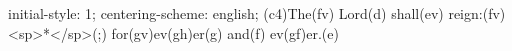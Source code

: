 initial-style: 1;
centering-scheme: english;
(c4)The(fv) Lord(d) shall(ev) reign:(fv) <sp>*</sp>(;) for(gv)ev(gh)er(g) and(f) ev(gf)er.(e)
